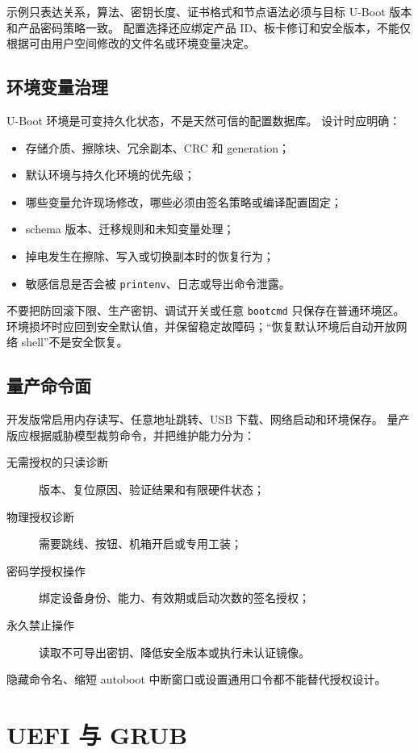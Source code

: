 示例只表达关系，算法、密钥长度、证书格式和节点语法必须与目标 U-Boot 版本和产品密码策略一致。
配置选择还应绑定产品 ID、板卡修订和安全版本，不能仅根据可由用户空间修改的文件名或环境变量决定。

\subsection{环境变量治理}

U-Boot 环境是可变持久化状态，不是天然可信的配置数据库。
设计时应明确：

\begin{itemize}
  \item 存储介质、擦除块、冗余副本、CRC 和 generation；
  \item 默认环境与持久化环境的优先级；
  \item 哪些变量允许现场修改，哪些必须由签名策略或编译配置固定；
  \item schema 版本、迁移规则和未知变量处理；
  \item 掉电发生在擦除、写入或切换副本时的恢复行为；
  \item 敏感信息是否会被 \texttt{printenv}、日志或导出命令泄露。
\end{itemize}

不要把防回滚下限、生产密钥、调试开关或任意 \texttt{bootcmd} 只保存在普通环境区。
环境损坏时应回到安全默认值，并保留稳定故障码；“恢复默认环境后自动开放网络 shell”不是安全恢复。

\subsection{量产命令面}

开发版常启用内存读写、任意地址跳转、USB 下载、网络启动和环境保存。
量产版应根据威胁模型裁剪命令，并把维护能力分为：

\begin{description}
  \item[无需授权的只读诊断] 版本、复位原因、验证结果和有限硬件状态；
  \item[物理授权诊断] 需要跳线、按钮、机箱开启或专用工装；
  \item[密码学授权操作] 绑定设备身份、能力、有效期或启动次数的签名授权；
  \item[永久禁止操作] 读取不可导出密钥、降低安全版本或执行未认证镜像。
\end{description}

隐藏命令名、缩短 autoboot 中断窗口或设置通用口令都不能替代授权设计。

\section{UEFI 与 GRUB}


